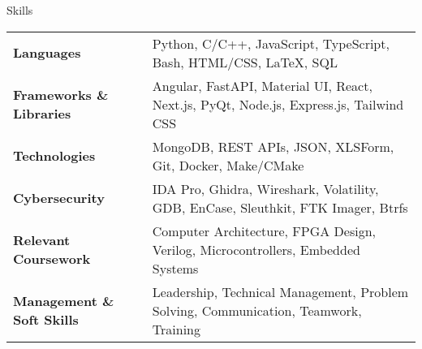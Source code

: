 \documentclass{resume} %
\date{\today}
\begin{document}
\begin{rSection}{Skills}

\begin{tabular}{ @{} >{\bfseries}l @{\hspace{8ex}} l }
Languages \ & Python, C/C++, JavaScript, TypeScript, Bash, HTML/CSS, \LaTeX, SQL \\
Frameworks \& Libraries \ & Angular, FastAPI, Material UI, React, Next.js, PyQt, Node.js, Express.js, Tailwind CSS \\
Technologies \ & MongoDB, REST APIs, JSON, XLSForm, Git, Docker, Make/CMake \\
Cybersecurity \ & IDA Pro, Ghidra, Wireshark, Volatility, GDB, EnCase, Sleuthkit, FTK Imager, Btrfs \\
Relevant Coursework \ & Computer Architecture, FPGA Design, Verilog, Microcontrollers, Embedded Systems \\
Management \& Soft Skills \ & Leadership, Technical Management, Problem Solving, Communication, Teamwork, Training \\
\end{tabular}
\end{rSection}
\end{document}
